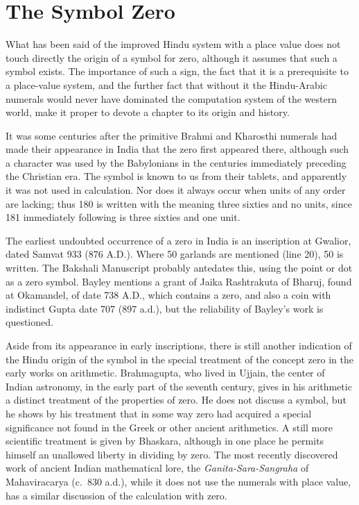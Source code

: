 \documentclass[11pt,a4paper]{article}
\begin{document}
\section{The Symbol Zero}

What has been said of the improved Hindu system with a place value does not touch directly the origin of a symbol for zero, although it assumes that such a symbol exists. The importance of such a sign, the fact that it is a prerequisite to a place-value system, and the further fact that without it the Hindu-Arabic numerals would never have dominated the computation system of the western world, make it proper to devote a chapter to its origin and history.

It was some centuries after the primitive Brahmi and Kharosthi numerals had made their appearance in India that the zero first appeared there, although such a character was used by the Babylonians in the centuries immediately preceding the Christian era. The symbol is known to us from their tablets, and apparently it was not used in calculation. Nor does it always occur when units of any order are lacking; thus 180 is written with the meaning three sixties and no units, since 181 immediately following is three sixties and one unit.

The earliest undoubted occurrence of a zero in India is an inscription at Gwalior, dated Samvat 933 (876 A.D.). Where 50 garlands are mentioned (line 20), 50 is written. The Bakshali Manuscript probably antedates this, using the point or dot as a zero symbol. Bayley mentions a grant of Jaika Rashtrakuta of Bharuj, found at Okamandel, of date 738 A.D., which contains a zero, and also a coin with indistinct Gupta date 707 (897 a.d.), but the reliability of Bayley's work is questioned.

Aside from its appearance in early inscriptions, there is still another indication of the Hindu origin of the symbol in the special treatment of the concept zero in the early works on arithmetic. Brahmagupta, who lived in Ujjain, the center of Indian astronomy, in the early part of the seventh century, gives in his arithmetic a distinct treatment of the properties of zero. He does not discuss a symbol, but he shows by his treatment that in some way zero had acquired a special significance not found in the Greek or other ancient arithmetics. A still more scientific treatment is given by Bhaskara, although in one place he permits himself an unallowed liberty in dividing by zero. The most recently discovered work of ancient Indian mathematical lore, the \textit{Ganita-Sara-Sangraha} of Mahaviracarya (c.~830 a.d.), while it does not use the numerals with place value, has a similar discussion of the calculation with zero.
\end{document}
